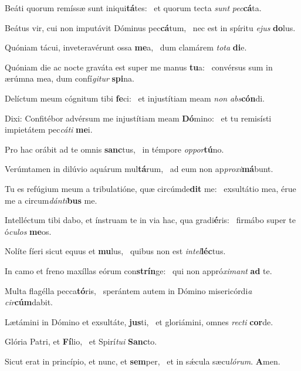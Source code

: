 \item Beáti quorum remíssæ sunt iniqui\textbf{tá}tes:~\psstar{} et quorum tecta \textit{sunt} \textit{pec}\textbf{cá}ta.
\item Beátus vir, cui non imputávit Dóminus pec\textbf{cá}tum,~\psstar{} nec est in spíritu \textit{ejus} \textbf{do}lus.
\item Quóniam tácui, inveteravérunt ossa \textbf{me}a,~\psstar{} dum clamárem \textit{tota} \textbf{di}e.
\item Quóniam die ac nocte graváta est super me manus \textbf{tu}a:~\psstar{} convérsus sum in ærúmna mea, dum confí\textit{gitur} \textbf{spi}na.
\item Delíctum meum cógnitum tibi \textbf{fe}ci:~\psstar{} et injustítiam meam \textit{non} \textit{abs}\textbf{cón}di.
\item Dixi: Confitébor advérsum me injustítiam meam \textbf{Dó}mino:~\psstar{} et tu remisísti impietátem pec\textit{cáti} \textbf{me}i.
\item Pro hac orábit ad te omnis \textbf{sanc}tus,~\psstar{} in témpore \textit{oppor}\textbf{tú}no.
\item Verúmtamen in dilúvio aquárum mul\textbf{tá}rum,~\psstar{} ad eum non ap\textit{proxi}\textbf{má}bunt.
\item Tu es refúgium meum a tribulatióne, quæ circúmde\textbf{dit} me:~\psstar{} exsultátio mea, érue me a circum\textit{dánti}\textbf{bus} me.
\item Intelléctum tibi dabo, et ínstruam te in via hac, qua gradi\textbf{é}ris:~\psstar{} firmábo super te ó\textit{culos} \textbf{me}os.
\item Nolíte fíeri sicut equus et \textbf{mu}lus,~\psstar{} quibus non est \textit{intel}\textbf{léc}tus.
\item In camo et freno maxíllas eórum con\textbf{strín}ge:~\psstar{} qui non appró\textit{ximant} \textbf{ad} te.
\item Multa flagélla pecca\textbf{tó}ris,~\psstar{} sperántem autem in Dómino misericórdi\textit{a} \textit{cir}\textbf{cúm}dabit.
\item Lætámini in Dómino et exsultáte, \textbf{jus}ti,~\psstar{} et gloriámini, omnes \textit{recti} \textbf{cor}de.
\item Glória Patri, et \textbf{Fí}lio,~\psstar{} et Spirí\textit{tui} \textbf{Sanc}to.
\item Sicut erat in princípio, et nunc, et \textbf{sem}per,~\psstar{} et in sǽcula sæcu\textit{lórum}. \textbf{A}men.

